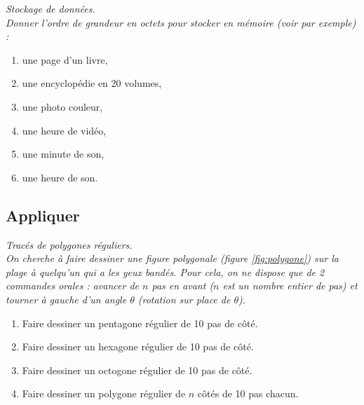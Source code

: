 \begin{td}\label{td:stock}\em Stockage de données.\\
Donner l'ordre de grandeur en octets pour stocker en mémoire
(voir \cite{delahaye} par exemple) :
\begin{enumerate}
\item une page d'un livre,
\item une encyclopédie en 20 volumes,
\item une photo couleur,
\item une heure de vidéo,
\item une minute de son,
\item une heure de son.
\end{enumerate}
\end{td}
\subsection{Appliquer}
\begin{td}\label{td:tortue}\em Tracés de polygones réguliers.\\
On cherche à faire dessiner une figure polygonale (figure \ref{fig:polygone}) 
sur la plage à quelqu'un qui a les yeux bandés.
Pour cela, on ne dispose que de 2 commandes orales :
avancer de $n$ pas en avant ($n$ est un nombre entier de pas) et 
tourner à gauche d'un angle $\theta$ (rotation sur place de $\theta$).
\begin{enumerate}
\item Faire dessiner un pentagone régulier de 10 pas de côté.
\item Faire dessiner un hexagone régulier de 10 pas de côté.
\item Faire dessiner un octogone régulier de 10 pas de côté.
\item Faire dessiner un polygone régulier de $n$ côtés de 10 pas chacun.
\end{enumerate}
\end{td}

